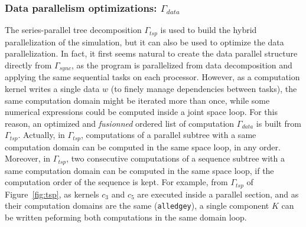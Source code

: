 \subsubsection*{Data parallelism optimizations: $\Gamma_{data}$}
The series-parallel tree decomposition $\Gamma_{tsp}$ is used to build the hybrid parallelization of the simulation, but it can also be used to optimize the data parallelization. In fact, it first seems natural to create the data parallel structure directly from $\Gamma_{sync}$, as the program is parallelized from data decomposition and applying the same sequential tasks on each processor. However, as a computation kernel writes a single data $w$ (to finely manage dependencies between tasks), the same computation domain might be iterated more than once, while some numerical expressions could be computed inside a joint space loop. For this reason, an optimized and \emph{fusionned} ordered list of computation $\Gamma_{data}$ is built from $\Gamma_{tsp}$. Actually, in $\Gamma_{tsp}$, computations of a parallel subtree with a same computation domain can be computed in the same space loop, in any order. Moreover, in $\Gamma_{tsp}$, two consecutive computations of a sequence subtree with a same computation domain can be computed in the same space loop, if the computation order of the sequence is kept. For example, from $\Gamma_{tsp}$ of Figure~\ref{fig:tsp}, as kernels $c_3$ and $c_5$ are executed inside a parallel section, and as their computation domains are the same (\texttt{alledgey}), a single component $K$ can be written peforming both computations in the same domain loop.



